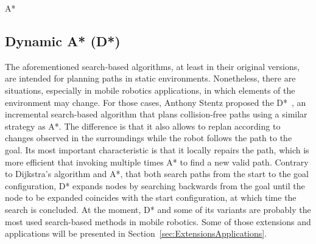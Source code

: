 \begin{algorithm}[htbp]
	\DontPrintSemicolon


 \caption{A*}
 \label{alg:A-star}
\end{algorithm}

\subsection{Dynamic A* (D*)}
\label{sec:D-star}

The aforementioned search-based algorithms, at least in their original versions,
are intended for planning paths in static environments. Nonetheless, there are
situations, especially in mobile robotics applications, in which elements of the
environment may change. For those cases, Anthony Stentz proposed the
\ac{D*}~\cite{Stentz1994,Stentz1995}, an incremental search-based algorithm that
plans collision-free paths using a similar strategy as A*. The difference is
that it also allows to replan according to changes observed in the surroundings
while the robot follows the path to the goal. Its most important characteristic
is that it locally repairs the path, which is more efficient that invoking
multiple times A* to find a new valid path. Contrary to Dijkstra's algorithm and
A*, that both search paths from the start to the goal configuration, \ac{D*}
expands nodes by searching backwards from the goal until the node to be expanded
coincides with the start configuration, at which time the search is concluded.
At the moment, \ac{D*} and some of its variants are probably the most used
search-based methods in mobile robotics. Some of those extensions and
applications will be presented in Section~\ref{sec:ExtensionsApplications}.

